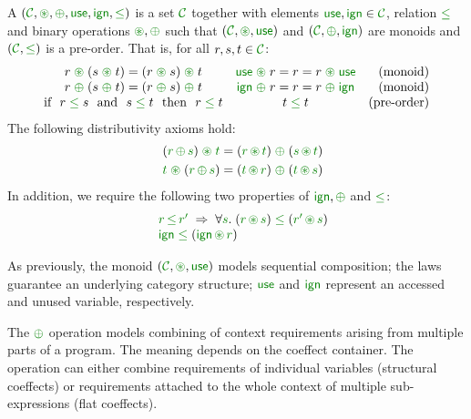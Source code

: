 \begin{definition}
A \emph{} $(\C, \cseq, \cpar, \cunit, \czero, \cleq)$ is a set
$\C$ together with elements $\cunit, \czero \in \C$, relation $\cleq$ and binary operations
$\cseq, \cpar$ such that $(\C, \cseq, \cunit)$ and $(\C, \cpar, \czero)$ are monoids and
$(\C, \cleq)$ is a pre-order. That is, for all $r,s,t\in \C$:
%
\begin{equation*}
\begin{array}{ccr}
r \;\cseq\; (s \;\cseq\; t) = (r \;\cseq\; s) \;\cseq\; t  &
\cunit \;\cseq\; r = r = r \;\cseq\; \cunit &
\textnormal{(monoid)}
\\
r \;\cpar\; (s \;\cpar\; t) = (r \;\cpar\; s) \;\cpar\; t &
\czero \;\cpar\; r = r = r \;\cpar\; \czero &
\textnormal{(monoid)}
\\
\textnormal{if}~~r\; \cleq\; s ~~\textnormal{and}~~s\; \cleq\; t~~\textnormal{then}~~r\; \cleq\; t&
t\; \cleq\; t &
\textnormal{(pre-order)}
\\
\end{array}
\end{equation*}
%
The following distributivity axioms hold:
\begin{align*}
\quad (\cclrd{r}\, \cpar\, \cclrd{s}) \;\cseq\; \cclrd{t} & = (\cclrd{r} \,\cseq\, \cclrd{t}) \;\cpar\; (\cclrd{s}\, \cseq\, \cclrd{t}) \\
\quad \cclrd{t} \;\cseq\; (\cclrd{r}\, \cpar\, \cclrd{s}) & = (\cclrd{t} \,\cseq\, \cclrd{r}) \;\cpar\; (\cclrd{t}\, \cseq\, \cclrd{s})
\end{align*}
%
In addition, we require the following two properties of $\czero, \cpar$ and $\cleq$:
\begin{equation*}
\begin{array}{l}
 \quad \cclrd{r}\,\cleq\,\cclrd{r'} \; \Rightarrow \; \forall\cclrd{s}.\;(\cclrd{r}\,\cseq\,\cclrd{s})\;\cleq\;(\cclrd{r'}\,\cseq\,\cclrd{s}) \\
 \quad \czero\;\cleq\;(\czero\,\cseq\,\cclrd{r})
\end{array}
\end{equation*}
\end{definition}

\noindent
As previously, the monoid $(\C,\cseq,\cunit)$ models sequential composition; the laws guarantee
an underlying category structure; $\cunit$ and $\czero$ represent an accessed and unused variable,
respectively.

The $\cpar$ operation models combining of context requirements arising from multiple parts of a
program. The meaning depends on the coeffect container. The operation can either combine requirements
of individual variables (structural coeffects) or requirements attached to the whole context of
multiple sub-exp\-ressions (flat coeffects).

